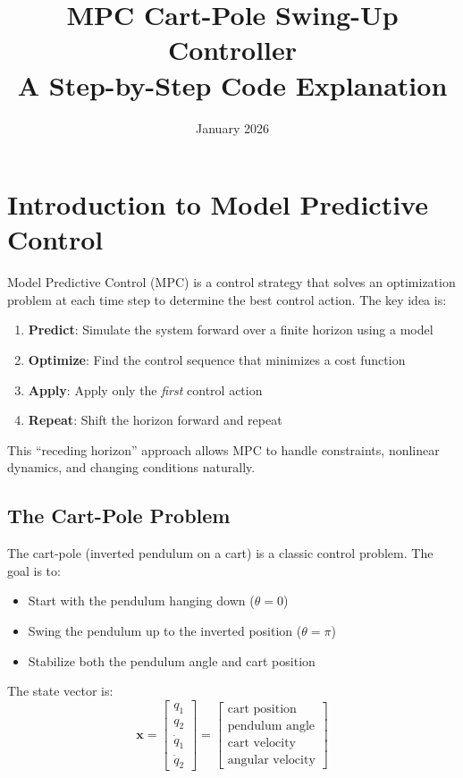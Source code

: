 \documentclass[11pt]{article}
\title{MPC Cart-Pole Swing-Up Controller\\[0.5em]\large A Step-by-Step Code Explanation}
\author{}
\date{January 2026}
\begin{document}
\maketitle

\tableofcontents
\newpage

\section{Introduction to Model Predictive Control}

Model Predictive Control (MPC) is a control strategy that solves an optimization problem at each time step to determine the best control action. The key idea is:

\begin{enumerate}
    \item \textbf{Predict}: Simulate the system forward over a finite horizon using a model
    \item \textbf{Optimize}: Find the control sequence that minimizes a cost function
    \item \textbf{Apply}: Apply only the \emph{first} control action
    \item \textbf{Repeat}: Shift the horizon forward and repeat
\end{enumerate}

This ``receding horizon'' approach allows MPC to handle constraints, nonlinear dynamics, and changing conditions naturally.

\subsection{The Cart-Pole Problem}

The cart-pole (inverted pendulum on a cart) is a classic control problem. The goal is to:
\begin{itemize}
    \item Start with the pendulum hanging down ($\theta = 0$)
    \item Swing the pendulum up to the inverted position ($\theta = \pi$)
    \item Stabilize both the pendulum angle and cart position
\end{itemize}

The state vector is:
\[
\mathbf{x} = \begin{bmatrix} q_1 \\ q_2 \\ \dot{q}_1 \\ \dot{q}_2 \end{bmatrix} = \begin{bmatrix} \text{cart position} \\ \text{pendulum angle} \\ \text{cart velocity} \\ \text{angular velocity} \end{bmatrix}
\]
\end{document}
